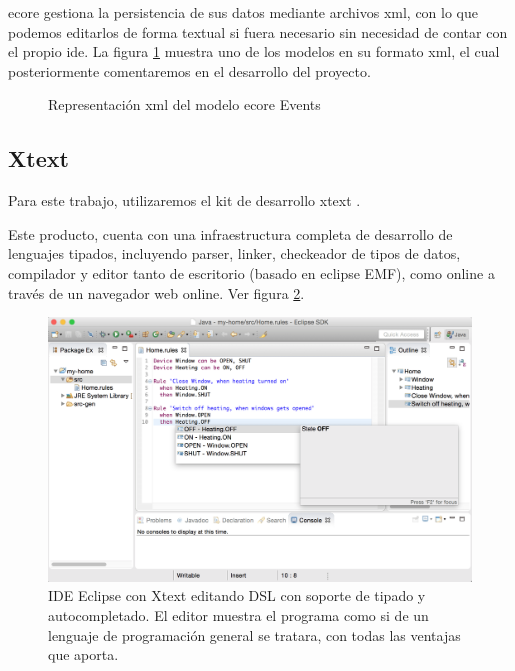 \gls{ecore} gestiona la persistencia de sus datos mediante archivos \gls{xml}, con lo que podemos editarlos de forma textual si fuera necesario sin necesidad de contar con el propio \gls{ide}. La figura \ref{fig:estado_ecore_xml} muestra uno de los modelos en su formato \gls{xml}, el cual posteriormente comentaremos en el desarrollo del proyecto.


\begin{figure}
	\centering
	
	
	
    \sourcepropia{}
    \caption{Representación \gls{xml} del modelo \gls{ecore} Events}
    \label{fig:estado_ecore_xml}
\end{figure}






\subsection{Xtext}

Para este trabajo, utilizaremos el kit de desarrollo \gls{xtext} \cite{xtext}.

Este producto, cuenta con una infraestructura completa de desarrollo de lenguajes tipados,  incluyendo parser, linker, checkeador de tipos de datos, compilador y editor tanto de escritorio (basado en eclipse EMF), como online a través de un navegador web online. Ver figura \ref{fig:xtext_editor_eclipse_dsl}.

\begin{figure}
	\centering
    \includegraphics[height=0.3\textheight]{images/estado_cuestion/xtext_screenshot.png}
    \caption[IDE Eclipse con Xtext editando DSL]{IDE Eclipse con Xtext editando DSL con soporte de tipado y autocompletado. El editor muestra el programa como si de un lenguaje de programación general se tratara, con todas las ventajas que aporta.}
    \label{fig:xtext_editor_eclipse_dsl}
\end{figure}

